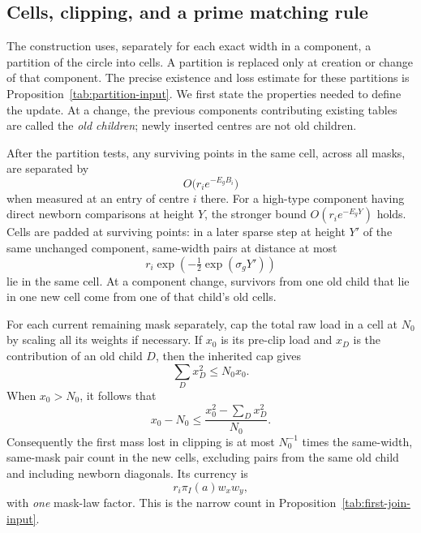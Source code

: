 \subsection{Cells, clipping, and a prime matching rule}

The construction uses, separately for each exact width in a component,
a partition of the circle into cells.  A partition is replaced only
at creation or change of that component.  The precise existence and
loss estimate for these partitions is
Proposition~\ref{tab:partition-input}.  We first state the properties
needed to define the update.
At a change, the previous components contributing existing tables are
called the \emph{old children}; newly inserted centres are not old
children.

After the partition tests, any surviving points in the same cell,
across all masks, are separated by
\begin{equation}
 O\bigl(r_i e^{-E_gB_i}\bigr)
 \label{tab:cell-span}
\end{equation}
when measured at an entry of centre $i$ there.  For a high-type
component having direct newborn comparisons at height $Y$, the
stronger bound $O(r_i e^{-E_gY})$ holds.  Cells are padded at surviving
points: in a later sparse step at height $Y'$ of the same unchanged
component, same-width pairs at distance at most
\[
 r_i\exp\left(-\tfrac12\exp(\sigma_gY')\right)
\]
lie in the same cell.  At a component change, survivors from one old
child that lie in one new cell come from one of that child's old
cells.

For each current remaining mask separately, cap the total raw load
in a cell at $N_0$ by scaling all its weights if necessary.  If $x_0$
is its pre-clip load and $x_D$ is the contribution of an old child $D$,
then the inherited cap gives
\begin{equation}
 \sum_Dx_D^2\le N_0x_0.
 \label{tab:clip-child}
\end{equation}
When $x_0>N_0$, it follows that
\[
 x_0-N_0
 \le\frac{x_0^2-\sum_Dx_D^2}{N_0}.
\]
Consequently the first mass lost in clipping is at most $N_0^{-1}$
times the same-width, same-mask pair count in the new cells, excluding
pairs from the same old child and including newborn diagonals.  Its
currency is
\begin{equation}
 r_i\pi_I(a)w_xw_y,
 \label{tab:one-law}
\end{equation}
with \emph{one} mask-law factor.  This is the narrow count in
Proposition~\ref{tab:first-join-input}.

